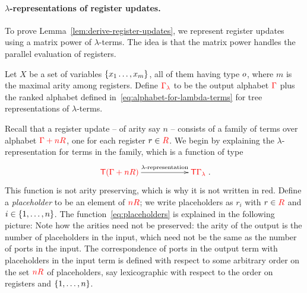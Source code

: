 \paragraph*{$\lambda$-representations of register updates.}
To prove Lemma~\ref{lem:derive-register-updates}, we represent  register updates using a matrix power of $\lambda$-terms. The idea is that the matrix power handles the parallel evaluation of registers.

Let $X$ be a set of variables $\{x_1\dots,x_m\}$, all of them having type $o$,  where $m$ is the maximal arity among registers. Define  ${\color{red}{\Gamma_\lambda}}$ to be the output alphabet ${\color{red}{\Gamma}}$ plus the ranked alphabet defined in~\eqref{eq:alphabet-for-lambda-terms} for tree representations of  $\lambda$-terms. 

Recall that a register update -- of arity say $n$ -- consists of a family of terms  over alphabet ${\color{red}{\Gamma + n{{\color{red}{R}}}}}$, one for each register $r \in {{\color{red}{R}}}$. We begin by explaining the $\lambda$-representation for terms in the family, which is a function 
 of type
\begin{align}\label{eq:placeholders}
\xymatrix@C=2cm{
    \ranked{\tmonad(\rGamma+n R)} \ar[r]^-{\text{$\lambda$-representation}} &
    \ranked{\tmonad {\Gamma_\lambda}}
}.
\end{align}
This function  is not arity preserving, which is why it is not written in red. Define a  \emph{placeholder} to be an element of ${\color{red}{n {{\color{red}{R}}}}}$; we write placeholders as $r_i$ with $r \in {{\color{red}{R}}}$ and  $i \in \{1,\ldots,n\}$.
The function~\eqref{eq:placeholders}  is  explained in the following picture:
Note how the  
 arities need not be preserved: the arity of the output is the number of placeholders in the input, which need not be the same as the number of ports in the input. The correspondence of ports in the output term with placeholders in the input term is defined with respect to some arbitrary order on the set ${\color{red}{n {{\color{red}{R}}}}}$ of placeholders, say lexicographic with respect to the order on registers and  $\{1,\ldots,n\}$.

